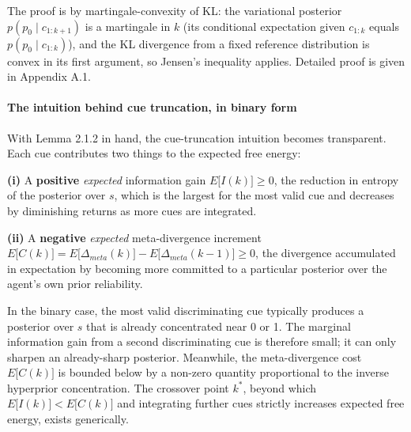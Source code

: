 \documentclass{article}
\begin{document}
The proof is by martingale-convexity of KL: the variational posterior
\(p(p_{0} \mid c_{1:k + 1})\) is a martingale in \(k\) (its conditional
expectation given \(c_{1:k}\) equals \(p(p_{0} \mid c_{1:k})\)), and the
KL divergence from a fixed reference distribution is convex in its first
argument, so Jensen's inequality applies. Detailed proof is given in
Appendix A.1.

\paragraph{The intuition behind cue truncation, in binary
form}\label{the-intuition-behind-cue-truncation-in-binary-form}

With Lemma 2.1.2 in hand, the cue-truncation intuition becomes
transparent. Each cue contributes two things to the expected free
energy:

\textbf{(i)} A \textbf{positive} \emph{expected} information gain
\(E\lbrack I(k)\rbrack \geq 0\), the reduction in entropy of the
posterior over \(s\), which is the largest for the most valid cue and
decreases by diminishing returns as more cues are integrated.

\textbf{(ii)} A \textbf{negative} \emph{expected} meta-divergence
increment
\(E\lbrack C(k)\rbrack = E\lbrack\Delta_{meta}(k)\rbrack - E\lbrack\Delta_{meta}(k - 1)\rbrack \geq 0\),
the divergence accumulated in expectation by becoming more committed to
a particular posterior over the agent's own prior reliability.

In the binary case, the most valid discriminating cue typically produces
a posterior over \(s\) that is already concentrated near 0 or 1. The
marginal information gain from a second discriminating cue is therefore
small; it can only sharpen an already-sharp posterior. Meanwhile, the
meta-divergence cost \(E\lbrack C(k)\rbrack\) is bounded below by a
non-zero quantity proportional to the inverse hyperprior concentration.
The crossover point \(k^{*}\), beyond which
\(E\lbrack I(k)\rbrack < E\lbrack C(k)\rbrack\) and integrating further
cues strictly increases expected free energy, exists generically.
\end{document}
